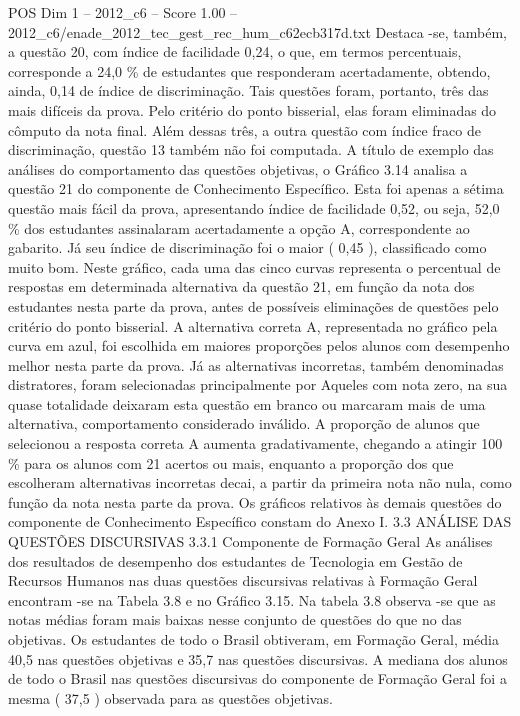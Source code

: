 \begin{textsample}{POS Dim 1 – 2012\_c6 – Score 1.00 – 2012\_c6/enade\_2012\_tec\_gest\_rec\_hum\_c62ecb317d.txt}
Destaca -se, também, a questão 20, com índice de facilidade 0,24, o que, em termos percentuais, corresponde a 24,0 \% de estudantes que responderam acertadamente, obtendo, ainda, 0,14 de índice de discriminação.
Tais questões foram, portanto, três das mais difíceis da prova.
Pelo critério do ponto bisserial, elas foram eliminadas do cômputo da nota final.
Além dessas três, a outra questão com índice fraco de discriminação, questão 13 também não foi computada.
A título de exemplo das análises do comportamento das questões objetivas, o Gráfico 3.14 analisa a questão 21 do componente de Conhecimento Específico.
Esta foi apenas a sétima questão mais fácil da prova, apresentando índice de facilidade 0,52, ou seja, 52,0 \% dos estudantes assinalaram acertadamente a opção A, correspondente ao gabarito.
Já seu índice de discriminação foi o maior ( 0,45 ), classificado como muito bom.
Neste gráfico, cada uma das cinco curvas representa o percentual de respostas em determinada alternativa da questão 21, em função da nota dos estudantes nesta parte da prova, antes de possíveis eliminações de questões pelo critério do ponto bisserial.
A alternativa correta A, representada no gráfico pela curva em azul, foi escolhida em maiores proporções pelos alunos com desempenho melhor nesta parte da prova.
Já as alternativas incorretas, também denominadas distratores, foram selecionadas principalmente por Aqueles com nota zero, na sua quase totalidade deixaram esta questão em branco ou marcaram mais de uma alternativa, comportamento considerado inválido.
A proporção de alunos que selecionou a resposta correta A aumenta gradativamente, chegando a atingir 100 \% para os alunos com 21 acertos ou mais, enquanto a proporção dos que escolheram alternativas incorretas decai, a partir da primeira nota não nula, como função da nota nesta parte da prova.
Os gráficos relativos às demais questões do componente de Conhecimento Específico constam do Anexo I. 3.3 ANÁLISE DAS QUESTÕES DISCURSIVAS 3.3.1 Componente de Formação Geral As análises dos resultados de desempenho dos estudantes de Tecnologia em Gestão de Recursos Humanos nas duas questões discursivas relativas à Formação Geral encontram -se na Tabela 3.8 e no Gráfico 3.15.
Na tabela 3.8 observa -se que as notas médias foram mais baixas nesse conjunto de questões do que no das objetivas.
Os estudantes de todo o Brasil obtiveram, em Formação Geral, média 40,5 nas questões objetivas e 35,7 nas questões discursivas.
A mediana dos alunos de todo o Brasil nas questões discursivas do componente de Formação Geral foi a mesma ( 37,5 ) observada para as questões objetivas.

\end{textsample}
